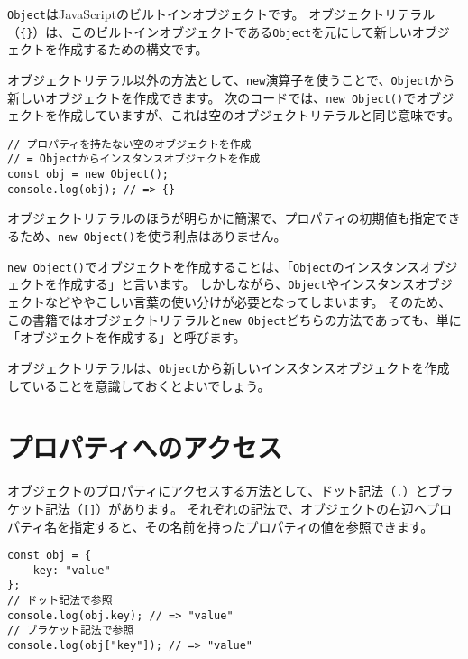 \texttt{Object}はJavaScriptのビルトインオブジェクトです。
オブジェクトリテラル（\texttt{\{\}}）は、このビルトインオブジェクトである\texttt{Object}を元にして新しいオブジェクトを作成するための構文です。

オブジェクトリテラル以外の方法として、\texttt{new}演算子を使うことで、\texttt{Object}から新しいオブジェクトを作成できます。
次のコードでは、\texttt{new Object()}でオブジェクトを作成していますが、これは空のオブジェクトリテラルと同じ意味です。

\begin{lstlisting}
// プロパティを持たない空のオブジェクトを作成
// = Objectからインスタンスオブジェクトを作成
const obj = new Object();
console.log(obj); // => {}
\end{lstlisting}

オブジェクトリテラルのほうが明らかに簡潔で、プロパティの初期値も指定できるため、\texttt{new Object()}を使う利点はありません。

\texttt{new Object()}でオブジェクトを作成することは、「\texttt{Object}のインスタンスオブジェクトを作成する」と言います。
しかしながら、\texttt{Object}やインスタンスオブジェクトなどややこしい言葉の使い分けが必要となってしまいます。
そのため、この書籍ではオブジェクトリテラルと\texttt{new Object}どちらの方法であっても、単に「オブジェクトを作成する」と呼びます。

オブジェクトリテラルは、\texttt{Object}から新しいインスタンスオブジェクトを作成していることを意識しておくとよいでしょう。

\hypertarget{property-access}{%
\section{プロパティへのアクセス}\label{property-access}}

オブジェクトのプロパティにアクセスする方法として、ドット記法（\texttt{.}）とブラケット記法（\texttt{[]}）があります。
それぞれの記法で、オブジェクトの右辺へプロパティ名を指定すると、その名前を持ったプロパティの値を参照できます。

\begin{lstlisting}
const obj = {
    key: "value"
};
// ドット記法で参照
console.log(obj.key); // => "value"
// ブラケット記法で参照
console.log(obj["key"]); // => "value"
\end{lstlisting}

